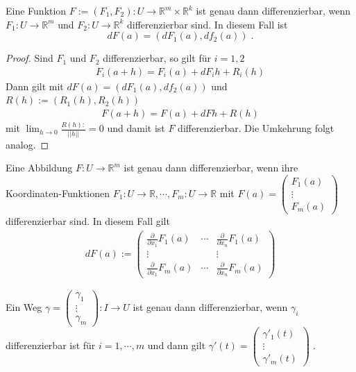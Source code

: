 \begin{Satz}
Eine Funktion $F:= (F_1, F_2) : U  \to \mathbb{R}^m \times \mathbb{R}^k$ ist genau dann differenzierbar, 
wenn $F_1 : U  \to \mathbb{R}^m$ und   $F_2 : U  \to \mathbb{R}^k$ differenzierbar sind. In diesem Fall ist
$$dF(a) = (dF_1(a), df_2 (a)) \;.$$ 
\end{Satz}
\begin{proof}
Sind $F_1$ und $F_2$ differenzierbar, so gilt für $i = 1,2$
\begin{align*}
F_i (a + h) = F_i(a) + dF_ih + R_i(h)
\end{align*}
Dann gilt mit $dF(a) = (dF_1(a), df_2 (a))$ und $R(h):= (R_1(h), R_2(h))$
\begin{align*}
F (a + h) = F (a) + dF h + R(h)
\end{align*}
mit $\lim_{h \to 0} \frac{R(h):}{||h||} = 0$ und damit ist $F$ differenzierbar. Die Umkehrung folgt analog.
\end{proof}

\begin{Bemerkung}
Eine Abbildung $F : U \to \mathbb{R}^m$ ist genau dann  differenzierbar, wenn ihre Koordinaten-Funktionen 
$F_1 : U \to \mathbb{R},  \cdots, F_m : U \to \mathbb{R}$ mit $F(a) = \begin{pmatrix} F_1(a) \\ \vdots \\ F_m(a) \end{pmatrix}$ differenzierbar sind. In diesem Fall gilt
\begin{align*}
dF(a) :=   \begin{pmatrix}  \frac{\partial}{\partial x_1}  F_1(a) & \cdots & \frac{\partial}{\partial x_n} F_1(a) \\ 
\vdots & & \vdots \\
\frac{\partial}{\partial x_1}  F_m(a) & \cdots & \frac{\partial}{\partial x_n} F_m(a) 
\end{pmatrix}
\end{align*}
\end{Bemerkung}

\begin{Bemerkung}
Ein Weg $\gamma =  \begin{pmatrix} \gamma_1  \\ \vdots \\ \gamma_m \end{pmatrix} : I \to U$ ist genau dann differenzierbar, wenn $\gamma_i$ differenzierbar ist für $i= 1, \cdots, m$ und dann gilt $\gamma'(t) =   \begin{pmatrix} \gamma'_1(t)  \\ \vdots \\ \gamma'_m(t) \end{pmatrix} \; .$
\end{Bemerkung}



